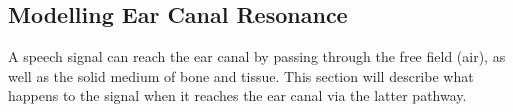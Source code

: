 % 
% 
% 
% 

\subsection{Modelling Ear Canal Resonance}
A speech signal can reach the ear canal by passing through the free field (air), as well as the solid medium of bone and tissue.  This section will describe what happens to the signal when it reaches the ear canal via the latter pathway. 

